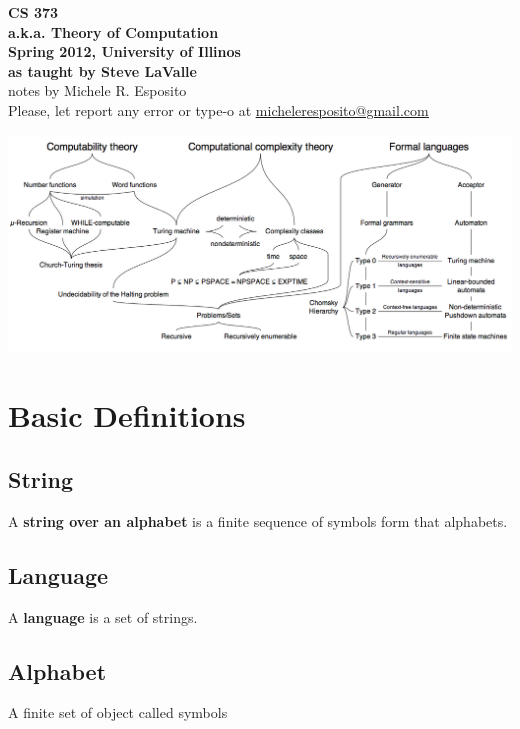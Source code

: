 \documentclass[a4paper]{article}
\begin{document}
\begin{center}
{\bf{\huge CS 373 }}\\
{\bf{\huge a.k.a. Theory of Computation}}\\
\vspace{ 5 cm }
{\bf{\large Spring 2012, University of Illinos}}\\
{\bf{\large as taught by Steve LaValle }}\\
\vspace{ 1 cm }                         
{\large notes by Michele R. Esposito}\\
\vspace{ 5cm }
Please, let report any error or type-o at \underline{\href{mailto:micheleresposito@gmail.com}{ micheleresposito@gmail.com }}

\end{center}
\newpage
\tableofcontents
\newpage
\includegraphics[scale=.38]{computer_theory.png}


\section{Basic Definitions} %
\label{sec:Basic Definitions}
\subsection{String} %
\label{sub:String}
A {\bf string over an alphabet} is a finite sequence of symbols form that alphabets.
\subsection{Language} %
\label{sub:Language}
A {\bf language} is a set of strings.
\subsection{Alphabet} %
\label{sub:Alphabet}
A finite set of object called symbols
\end{document}

